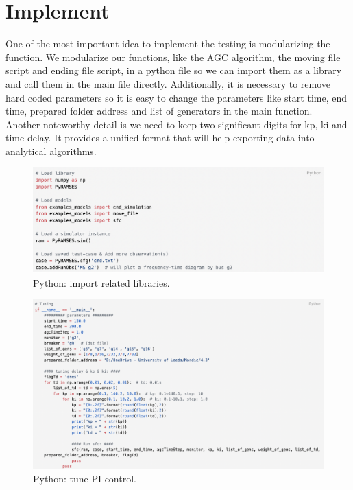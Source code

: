 \documentclass{report}
\begin{document}
\section{Implement} %
One of the most important idea to implement the testing is modularizing the function. We modularize our functions, like the AGC algorithm, the moving file script and ending file script, in a python file so we can import them as a library and call them in the main file directly. Additionally, it is necessary to remove hard coded parameters so it is easy to change the parameters like start time, end time, prepared folder address and list of generators in the main function.\\

Another noteworthy detail is we need to keep two significant digits for kp, ki and time delay. It provides a unified format that will help exporting data into analytical algorithms.\\

\begin{figure}[htbp]
\centering
\includegraphics[width = \textwidth]{figure/4_3_code1.png}
\caption{Python: import related libraries.}
\label{4_3_code1}
\end{figure}

\begin{figure}[htbp]
\centering
\includegraphics[width = \textwidth]{figure/4_3_code2.png}
\caption{Python: tune PI control.}
\label{4_3_code2}
\end{figure}
\end{document}
